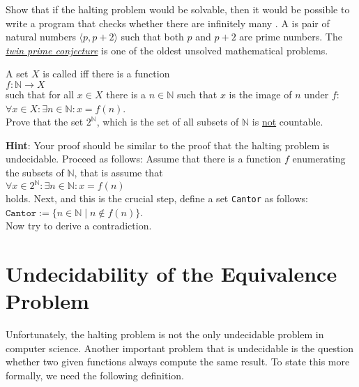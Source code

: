 \exerciseEng
Show that if the halting problem would be solvable, then it would be possible to write a program that checks
whether there are infinitely many .  A  is pair of natural numbers
$\langle p, p + 2 \rangle$ such that both $p$ and $p+2$ are prime numbers.  
The \href{http://en.wikipedia.org/wiki/Twin_prime_conjecture}{\emph{twin prime conjecture}} is one
of the oldest unsolved mathematical problems.  \eox

\exerciseEng
A set $X$ is called   iff there is a function 
\\[0.2cm]
\hspace*{1.3cm}
 $f: \mathbb{N} \rightarrow X$ 
\\[0.2cm]
such that for all $x\in X$ there is a $n \in \mathbb{N}$ such that $x$ is the image of
$n$ under $f$: 
\\[0.2cm]
\hspace*{1.3cm} $\forall x \in X: \exists n \in \mathbb{N}: x = f(n)$.
\\[0.2cm]
Prove that the set $2^\mathbb{N}$, which is the set of all subsets of $\mathbb{N}$ is \underline{not} countable. 

\vspace*{0.2cm}

\noindent
\textbf{Hint}:  Your proof should be similar to the proof that the halting problem is undecidable. 
Proceed as follows:
Assume that there is a function $f$ enumerating the subsets of $\mathbb{N}$, that is assume that 
\\[0.2cm]
\hspace*{1.3cm}
$\forall x \in 2^\mathbb{N}: \exists n \in \mathbb{N}: x = f(n)$
\\[0.2cm]
holds.  Next, and this is the crucial step, define a set \texttt{Cantor} as follows:
\\[0.2cm]
\hspace*{1.3cm} $\mathtt{Cantor} := \bigl\{ n \in \mathbb{N} \mid n \notin f(n) \bigr\}$.
\\[0.2cm]
Now try to derive a contradiction.  \eox



\section[The Equivalence Problem]{Undecidability of the Equivalence Problem}
Unfortunately, the halting problem is not the only undecidable problem in computer science.  Another
important problem that is undecidable is the question whether two given functions always compute the
same result.  To state this more formally, we need the following definition.


